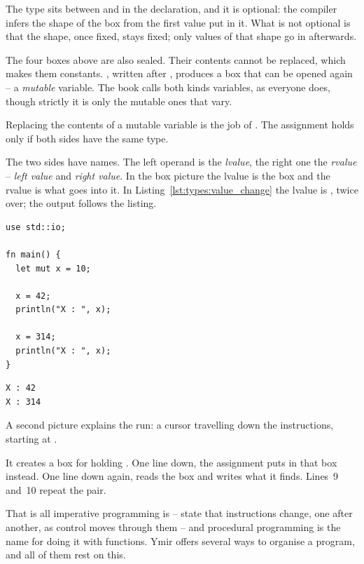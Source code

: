 The type sits between \token{:} and \token{=} in the declaration, and it is
optional: the compiler infers the shape of the box from the first value put in
it. What is not optional is that the shape, once fixed, stays fixed; only values
of that shape go in afterwards.

The four boxes above are also sealed. Their contents cannot be replaced, which
makes them constants. , written after , produces a box that
can be opened again -- a \textit{mutable} variable. The book calls both kinds
variables, as everyone does, though strictly it is only the mutable ones that
vary.



Replacing the contents of a mutable variable is the job of \token{=}. The
assignment holds only if both sides have the same type.

The two sides have names. The left operand is the \textit{lvalue}, the right one
the \textit{rvalue} -- \textit{left value} and \textit{right value}. In the box
picture the lvalue is the box and the rvalue is what goes into it. In
Listing~\ref{lst:types:value_change} the lvalue is , twice over; the
output follows the listing.

\begin{lstlisting}[style=coloredverbatim, caption=Example of mutable variable, label=lst:types:value_change]
use std::io;

fn main() {
  let mut x = 10;

  x = 42;
  println("X : ", x);

  x = 314;
  println("X : ", x);
}
\end{lstlisting}
\vspace{-10pt}%
\begin{lstlisting}[style=bashVerb, label=lst:types:value_change_output]
X : 42
X : 314
\end{lstlisting}

A second picture explains the run: a cursor travelling down the instructions,
starting at .

It creates a box for  holding . One line down, the assignment
puts  in that box instead. One line down again,  reads
the box and writes what it finds. Lines~9 and~10 repeat the pair.

That is all imperative programming is -- state that instructions change, one
after another, as control moves through them -- and procedural programming is the
name for doing it with functions. Ymir offers several ways to organise a program,
and all of them rest on this.
